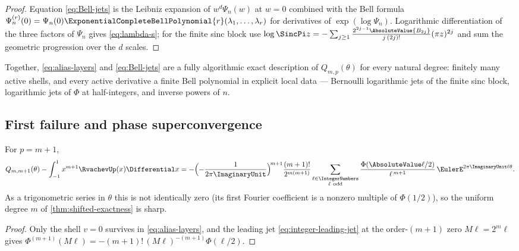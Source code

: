 \begin{proof}
Equation \eqref{eq:Bell-jets} is the Leibniz expansion of
$w^{d}\Psi_n(w)$ at $w=0$ combined with the Bell formula
$\Psi_n^{(r)}(0)=\Psi_n(0)\ExponentialCompleteBellPolynomial{r}(\lambda_1,\dots,\lambda_r)$ for
derivatives of $\exp(\log\Psi_n)$.  Logarithmic differentiation of the
three factors of $\Psi_n$ gives \eqref{eq:lambda-s}; for the finite
sinc block use
$\log\SincPi z=-\sum_{j\ge1}
\frac{2^{2j-1}\AbsoluteValue{B_{2j}}}{j\,(2j)!}(\pi z)^{2j}$
and sum the geometric progression over the $d$ scales.
\end{proof}

Together, \eqref{eq:alias-layers} and \eqref{eq:Bell-jets} are a fully
algorithmic exact description of $Q_{m,p}(\theta)$ for every natural
degree: finitely many active shells, and every active derivative a
finite Bell polynomial in explicit local data ---
Bernoulli logarithmic jets of the finite sinc block, logarithmic jets
of $\Phi$ at half-integers, and inverse powers of $n$.

\subsection{First failure and phase superconvergence}

\begin{theorem}
\label{thm:first-failure}
For $p=m+1$,
\begin{equation}
 Q_{m,m+1}(\theta)-\int_{-1}^{1}x^{m+1}\RvachevUp(x)\Differential x
 =-\Bigl(-\frac{1}{2\pi\ImaginaryUnit}\Bigr)^{\!m+1}
 \frac{(m+1)!}{2^{m(m+1)}}
 \sum_{\substack{\ell\in\IntegerNumbers\\ \ell\ \mathrm{odd}}}
 \frac{\Phi(\AbsoluteValue\ell/2)}{\ell^{\,m+1}}\,
 \EulerE^{2\pi\ImaginaryUnit\ell\theta}.
 \label{eq:first-failure}
\end{equation}
As a trigonometric series in $\theta$ this is not identically zero
(its first Fourier coefficient is a nonzero multiple of
$\Phi(1/2)$), so the uniform degree $m$ of
\cref{thm:shifted-exactness} is sharp.
\end{theorem}

\begin{proof}
Only the shell $v=0$ survives in \eqref{eq:alias-layers}, and the
leading jet \eqref{eq:integer-leading-jet} at the order-$(m{+}1)$ zero
$M\ell=2^{m}\ell$ gives
$\Phi^{(m+1)}(M\ell)=-(m+1)!\,(M\ell)^{-(m+1)}\Phi(\ell/2)$.
\end{proof}

